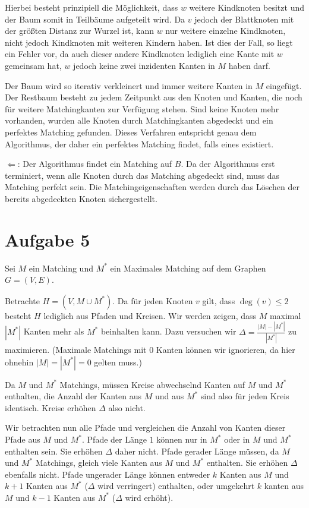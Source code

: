 \documentclass[a4paper]{article}
\begin{document}
Hierbei besteht prinzipiell die Möglichkeit, dass $w$ weitere Kindknoten
besitzt und der Baum somit in Teilbäume aufgeteilt wird. Da $v$ jedoch der
Blattknoten mit der größten Distanz zur Wurzel ist, kann $w$ nur weitere
einzelne Kindknoten, nicht jedoch Kindknoten mit weiteren Kindern haben.
Ist dies der Fall, so liegt ein Fehler vor, da auch dieser andere Kindknoten
lediglich eine Kante mit $w$ gemeinsam hat, $w$ jedoch keine zwei inzidenten
Kanten in $M$ haben darf.

Der Baum wird so iterativ verkleinert und immer weitere Kanten in $M$
eingefügt. Der Restbaum besteht zu jedem Zeitpunkt aus den Knoten und
Kanten, die noch für weitere Matchingkanten zur Verfügung stehen.
Sind keine Knoten mehr vorhanden, wurden alle Knoten durch Matchingkanten
abgedeckt und ein perfektes Matching gefunden.
Dieses Verfahren entspricht genau dem Algorithmus, der daher ein perfektes
Matching findet, falls eines existiert.

$\Leftarrow$: Der Algorithmus findet ein Matching auf $B$. Da der
Algorithmus erst terminiert, wenn alle Knoten durch das Matching abgedeckt
sind, muss das Matching perfekt sein. Die Matchingeigenschaften werden durch
das Löschen der bereits abgedeckten Knoten sichergestellt.

\section{Aufgabe 5}
Sei $M$ ein Matching und $M^*$ ein Maximales Matching auf dem Graphen $G = (V,
E)$.

Betrachte $H = (V, M \cup M^*)$. Da für jeden Knoten $v$ gilt, dass $\deg(v)
\leq 2$ besteht $H$ lediglich aus Pfaden und Kreisen. Wir werden zeigen,
dass $M$ maximal $|M^*|$ Kanten mehr als $M^*$ beinhalten kann. Dazu
versuchen wir $\Delta = \frac{|M| - |M^*|}{|M^*|}$ zu maximieren. (Maximale
Matchings mit $0$ Kanten können wir ignorieren, da hier ohnehin $|M| = |M^*|
= 0$ gelten muss.)

Da $M$ und $M^*$ Matchings, müssen Kreise abwechselnd Kanten auf $M$ und
$M^*$ enthalten, die Anzahl der Kanten aus $M$ und aus $M^*$ sind also für
jeden Kreis identisch. Kreise erhöhen $\Delta$ also nicht.

Wir betrachten nun alle Pfade und vergleichen die Anzahl von Kanten dieser
Pfade aus $M$ und $M^*$. Pfade der Länge $1$ können nur in $M^*$ oder in 
$M$ und $M^*$ enthalten sein. Sie erhöhen $\Delta$ daher nicht.
Pfade gerader Länge müssen, da $M$ und $M^*$ Matchings, gleich viele Kanten
aus $M$ und $M^*$ enthalten. Sie erhöhen $\Delta$ ebenfalls nicht.
Pfade ungerader Länge können entweder $k$ Kanten aus $M$ und $k+1$ Kanten
aus $M^*$ ($\Delta$ wird verringert) enthalten, oder umgekehrt $k$ kanten
aus $M$ und $k-1$ Kanten aus $M^*$ ($\Delta$ wird erhöht).
\end{document}
